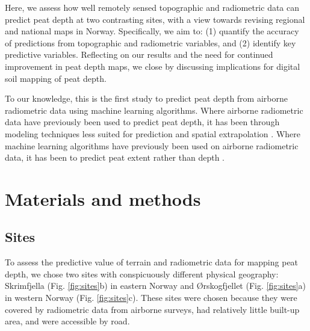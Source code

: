 \documentclass[soil, manuscript]{copernicus}
\begin{document}
Here, we assess how well remotely sensed topographic and radiometric data can predict peat depth at two contrasting sites, with a view towards revising regional and national maps in Norway.
Specifically, we aim to: (1) quantify the accuracy of predictions from topographic and radiometric variables, and (2) identify key predictive variables.
Reflecting on our results and the need for continued improvement in peat depth maps, we close by discussing implications for digital soil mapping of peat depth.

To our knowledge, this is the first study to predict peat depth from airborne radiometric data using machine learning algorithms.
Where airborne radiometric data have previously been used to predict peat depth, it has been through modeling techniques less suited for prediction and spatial extrapolation \citep[e.g.,][]{keaneySpatialStatisticsEstimate2013, gatisMappingUplandPeat2019, siemonAirborneElectromagneticRadiometric2020}.
Where machine learning algorithms have previously been used on airborne radiometric data, it has been to predict peat extent rather than depth \citep[e.g.,][]{olearyDigitalSoilMapping2022}.

\section{Materials and methods}

\subsection{Sites}

To assess the predictive value of terrain and radiometric data for mapping peat depth, we chose two sites with conspicuously different physical geography: Skrimfjella (Fig. \ref{fig:sites}b) in eastern Norway and Ørskogfjellet (Fig. \ref{fig:sites}a) in western Norway (Fig. \ref{fig:sites}c).
These sites were chosen because they were covered by radiometric data from airborne surveys, had relatively little built-up area, and were accessible by road.
\end{document}
